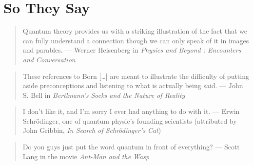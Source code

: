 \section*{So They Say}
\begin{scriptsize}
\begin{quote}
  Quantum theory provides us with a striking illustration of the fact that
  we can fully understand a connection though we can only speak of it in
  images and parables. --- Werner Heisenberg in \emph{Physics and Beyond :
    Encounters and Conversation} 
\end{quote}
\begin{quote}
  These references to Born [\ldots] are meant to illustrate the difficulty
  of putting aside preconceptions and listening to what is actually being
  said. --- John S. Bell in \emph{Bertlmann's Socks and the Nature of
    Reality} 
\end{quote}
\begin{quote}
  I don't like it, and I'm sorry I ever had anything to do with it. ---
  Erwin Schr\"{o}dinger, one of quantum physic's founding scientists
  (attributed by John Gribbin, \emph{In Search of Schr\"{o}dinger's Cat}) 
\end{quote}
\begin{quote}
  Do you guys just put the word quantum in front of everything? --- Scott
  Lang in the movie \emph{Ant-Man and the Wasp}
\end{quote}
\end{scriptsize}